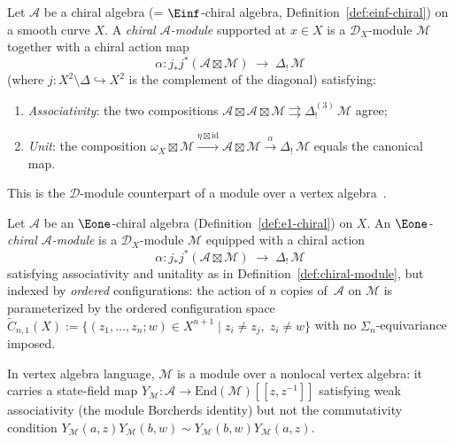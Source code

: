 \begin{definition}\label{def:chiral-module}
Let $\mathcal{A}$ be a chiral algebra (= $\Einf$-chiral algebra,
Definition~\ref{def:einf-chiral}) on a smooth curve $X$. A
\emph{chiral $\mathcal{A}$-module} supported at $x \in X$ is a
$\mathcal{D}_X$-module $\mathcal{M}$ together with a chiral action map
\[
\alpha: j_* j^*(\mathcal{A} \boxtimes \mathcal{M})
\;\longrightarrow\; \Delta_!\, \mathcal{M}
\]
(where $j: X^2 \setminus \Delta \hookrightarrow X^2$ is the complement
of the diagonal) satisfying:
\begin{enumerate}[label=(\roman*)]
\item \emph{Associativity}: the two compositions
 $\mathcal{A} \boxtimes \mathcal{A} \boxtimes \mathcal{M}
 \rightrightarrows \Delta^{(3)}_!\,\mathcal{M}$ agree;
\item \emph{Unit}: the composition
 $\omega_X \boxtimes \mathcal{M} \xrightarrow{\eta \boxtimes
 \mathrm{id}} \mathcal{A} \boxtimes \mathcal{M}
 \xrightarrow{\alpha} \Delta_!\,\mathcal{M}$
 equals the canonical map.
\end{enumerate}
This is the $\mathcal{D}$-module counterpart of a module over a vertex
algebra~\cite[\S3.6]{BD04}.
\end{definition}

\begin{definition}\label{def:e1-chiral-module}
Let $\mathcal{A}$ be an $\Eone$-chiral algebra
(Definition~\ref{def:e1-chiral}) on $X$. An \emph{$\Eone$-chiral
$\mathcal{A}$-module} is a $\mathcal{D}_X$-module $\mathcal{M}$
equipped with a chiral action
\[
\alpha: j_* j^*(\mathcal{A} \boxtimes \mathcal{M})
\;\longrightarrow\; \Delta_!\, \mathcal{M}
\]
satisfying associativity and unitality as in
Definition~\ref{def:chiral-module}, but indexed by \emph{ordered}
configurations: the action of $n$ copies of~$\mathcal{A}$ on
$\mathcal{M}$ is parameterized by the ordered configuration space
$\widetilde{C}_{n,1}(X) := \{(z_1, \ldots, z_n; w) \in X^{n+1}
\mid z_i \neq z_j,\; z_i \neq w\}$
with no $\Sigma_n$-equivariance imposed.

In vertex algebra language, $\mathcal{M}$ is a module over a nonlocal
vertex algebra: it carries a state-field map
$Y_{\mathcal{M}}: \mathcal{A} \to \mathrm{End}(\mathcal{M})[[z, z^{-1}]]$
satisfying weak associativity (the module Borcherds identity) but not
the commutativity condition
$Y_{\mathcal{M}}(a,z) Y_{\mathcal{M}}(b,w) \sim
Y_{\mathcal{M}}(b,w) Y_{\mathcal{M}}(a,z)$.
\end{definition}

